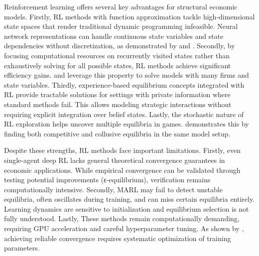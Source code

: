 Reinforcement learning offers several key advantages for structural economic models. Firstly, RL methods with function approximation tackle high-dimensional state spaces that render traditional dynamic programming infeasible. Neural network representations can handle continuous state variables and state dependencies without discretization, as demonstrated by \citet{Covarrubias2022} and \citet{curry2022}. Secondly, by focusing computational resources on recurrently visited states rather than exhaustively solving for all possible states, RL methods achieve significant efficiency gains. \citet{FershtmanPakes2012} and \citet{Hollenbeck2019} leverage this property to solve models with many firms and state variables. Thirdly, experience-based equilibrium concepts integrated with RL provide tractable solutions for settings with private information where standard methods fail. This allows modeling strategic interactions without requiring explicit integration over belief states. Lastly, the stochastic nature of RL exploration helps uncover multiple equilibria in games. \citet{Covarrubias2022} demonstrates this by finding both competitive and collusive equilibria in the same model setup.

Despite these strengths, RL methods face important limitations. Firstly, even single-agent deep RL lacks general theoretical convergence guarantees in economic applications. While empirical convergence can be validated through testing potential improvements (ε-equilibrium), verification remains computationally intensive. Secondly, MARL may fail to detect unstable equilibria, often oscillates during training, and can miss certain equilibria entirely. Learning dynamics are sensitive to initialization and equilibrium selection is not fully understood. Lastly, These methods remain computationally demanding, requiring GPU acceleration and careful hyperparameter tuning. As shown by \citet{GrafEtAl2024}, achieving reliable convergence requires systematic optimization of training parameters.
